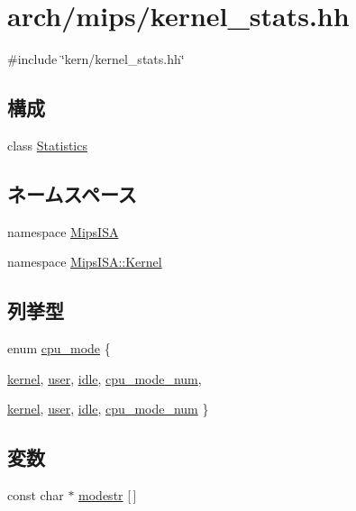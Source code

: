 \hypertarget{arch_2mips_2kernel__stats_8hh}{
\section{arch/mips/kernel\_\-stats.hh}
\label{arch_2mips_2kernel__stats_8hh}
}
{\ttfamily \#include \char`\"{}kern/kernel\_\-stats.hh\char`\"{}}\par
\subsection*{構成}
\begin{DoxyCompactItemize}
\item 
class \hyperlink{classMipsISA_1_1Kernel_1_1Statistics}{Statistics}
\end{DoxyCompactItemize}
\subsection*{ネームスペース}
\begin{DoxyCompactItemize}
\item 
namespace \hyperlink{namespaceMipsISA}{MipsISA}
\item 
namespace \hyperlink{namespaceMipsISA_1_1Kernel}{MipsISA::Kernel}
\end{DoxyCompactItemize}
\subsection*{列挙型}
\begin{DoxyCompactItemize}
\item 
enum \hyperlink{namespaceMipsISA_1_1Kernel_aa1fc3805dac6f71f457fbbc263105bf6}{cpu\_\-mode} \{ \par
\hyperlink{namespaceMipsISA_1_1Kernel_aa1fc3805dac6f71f457fbbc263105bf6a2ff12ba84b360bbe1553c9070a5aa517}{kernel}, 
\hyperlink{namespaceMipsISA_1_1Kernel_aa1fc3805dac6f71f457fbbc263105bf6a5cc32e366c87c4cb49e4309b75f57d64}{user}, 
\hyperlink{namespaceMipsISA_1_1Kernel_aa1fc3805dac6f71f457fbbc263105bf6a657bea711150a583900d447bce32bf23}{idle}, 
\hyperlink{namespaceMipsISA_1_1Kernel_aa1fc3805dac6f71f457fbbc263105bf6aa991579b19b0713f97176b3d761314df}{cpu\_\-mode\_\-num}, 
\par
\hyperlink{namespaceMipsISA_1_1Kernel_aa1fc3805dac6f71f457fbbc263105bf6a2ff12ba84b360bbe1553c9070a5aa517}{kernel}, 
\hyperlink{namespaceMipsISA_1_1Kernel_aa1fc3805dac6f71f457fbbc263105bf6a5cc32e366c87c4cb49e4309b75f57d64}{user}, 
\hyperlink{namespaceMipsISA_1_1Kernel_aa1fc3805dac6f71f457fbbc263105bf6a657bea711150a583900d447bce32bf23}{idle}, 
\hyperlink{namespaceMipsISA_1_1Kernel_aa1fc3805dac6f71f457fbbc263105bf6aa991579b19b0713f97176b3d761314df}{cpu\_\-mode\_\-num}
 \}
\end{DoxyCompactItemize}
\subsection*{変数}
\begin{DoxyCompactItemize}
\item 
const char $\ast$ \hyperlink{namespaceMipsISA_1_1Kernel_a779f5671616442e377e5078bf4c9bd82}{modestr} \mbox{[}$\,$\mbox{]}
\end{DoxyCompactItemize}
